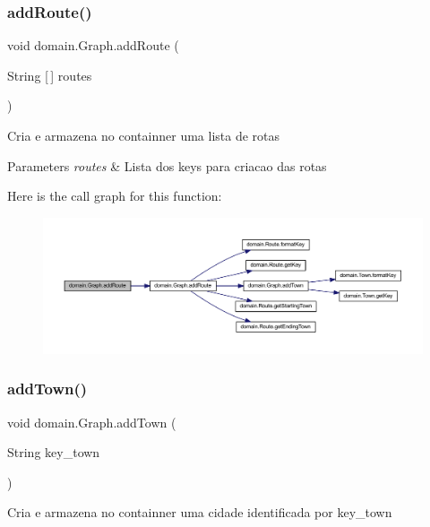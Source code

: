 \subsubsection{\texorpdfstring{add\+Route()}{addRoute()}\hspace{0.1cm}{\footnotesize\ttfamily [2/2]}}
{\footnotesize\ttfamily void domain.\+Graph.\+add\+Route (\begin{DoxyParamCaption}\item[{String \mbox{[}$\,$\mbox{]}}]{routes }\end{DoxyParamCaption})}

Cria e armazena no containner uma lista de rotas


\begin{DoxyParams}{Parameters}
{\em routes} & Lista dos keys para criacao das rotas \\
\hline
\end{DoxyParams}
Here is the call graph for this function\+:\nopagebreak
\begin{figure}[H]
\begin{center}
\leavevmode
\includegraphics[width=350pt]{classdomain_1_1_graph_a356a31b6dba042cccb2a743caa07bfdf_cgraph}
\end{center}
\end{figure}
\mbox{\label{classdomain_1_1_graph_a93f040b758a5f920d195f2fbfdccc741}} 
\subsubsection{\texorpdfstring{add\+Town()}{addTown()}}
{\footnotesize\ttfamily void domain.\+Graph.\+add\+Town (\begin{DoxyParamCaption}\item[{String}]{key\+\_\+town }\end{DoxyParamCaption})}

Cria e armazena no containner uma cidade identificada por key\+\_\+town


